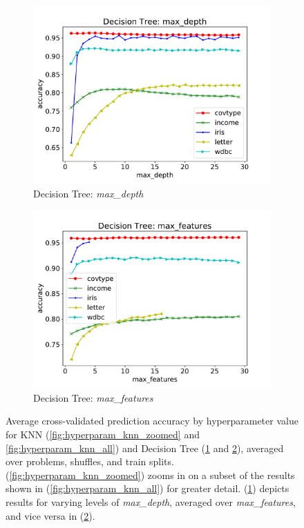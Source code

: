 \documentclass[twoside,11pt]{article}
\begin{document}
\begin{figure}[h]
\begin{framed}
					\begin{subfigure}[b]{.49\linewidth}
						\includegraphics[width=\linewidth]{dt_hyperparam_max_depth}
						\caption{Decision Tree: \textit{max\_depth}}
						\label{fig:hyperparam_dt_max_depth}
					\end{subfigure}
					\begin{subfigure}[b]{.49\linewidth}
						\includegraphics[width=\linewidth]{dt_hyperparam_max_features}
						\caption{Decision Tree: \textit{max\_features}}
						\label{fig:hyperparam_dt_max_features}
					\end{subfigure}
					
					\caption{Average cross-validated prediction accuracy by hyperparameter value for KNN (\ref{fig:hyperparam_knn_zoomed} and \ref{fig:hyperparam_knn_all}) and Decision Tree (\ref{fig:hyperparam_dt_max_depth} and \ref{fig:hyperparam_dt_max_features}), averaged over problems, shuffles, and train splits. (\ref{fig:hyperparam_knn_zoomed}) zooms in on a subset of the results shown in (\ref{fig:hyperparam_knn_all}) for greater detail. (\ref{fig:hyperparam_dt_max_depth}) depicts results for varying levels of \textit{max\_depth}, averaged over \textit{max\_features}, and vice versa in (\ref{fig:hyperparam_dt_max_features}).}
					\label{fig:hyperparam_knn_dt}
				\end{framed}
			\end{figure}
			
\end{document}

